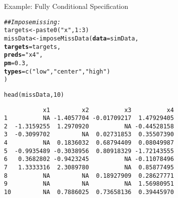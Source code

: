 \documentclass[10pt]{beamer}\usepackage[]{graphicx}\usepackage[]{color}
\makeatletter
\newcommand{\hlnum}[1]{\textcolor[rgb]{0.69,0.494,0}{#1}}%
\newcommand{\hlstr}[1]{\textcolor[rgb]{0.749,0.012,0.012}{#1}}%
\newcommand{\hlcom}[1]{\textcolor[rgb]{0.514,0.506,0.514}{\textit{#1}}}%
\newcommand{\hlopt}[1]{\textcolor[rgb]{0,0,0}{#1}}%
\newcommand{\hlstd}[1]{\textcolor[rgb]{0,0,0}{#1}}%
\newcommand{\hlkwb}[1]{\textcolor[rgb]{0,0.341,0.682}{#1}}%
\newcommand{\hlkwc}[1]{\textcolor[rgb]{0,0,0}{\textbf{#1}}}%
\newcommand{\hlkwd}[1]{\textcolor[rgb]{0.004,0.004,0.506}{#1}}%
\newenvironment{kframe}{%
 \def\at@end@of@kframe{}%
 \ifinner\ifhmode%
  \def\at@end@of@kframe{\end{minipage}}%
  \begin{minipage}{\columnwidth}%
 \fi\fi%
 \def\FrameCommand##1{\hskip\@totalleftmargin \hskip-\fboxsep
 \colorbox{shadecolor}{##1}\hskip-\fboxsep
     \hskip-\linewidth \hskip-\@totalleftmargin \hskip\columnwidth}%
 \MakeFramed {\advance\hsize-\width
   \@totalleftmargin\z@ \linewidth\hsize
   \@setminipage}}%
 {\par\unskip\endMakeFramed%
 \at@end@of@kframe}
\newenvironment{knitrout}{}{} %
\makeatother
\begin{document}

\begin{frame}{Example: Fully Conditional Specification}

\begin{knitrout}\footnotesize
{}\color{fgcolor}\begin{kframe}
\begin{alltt}
\hlcom{## Impose missing:}
\hlstd{targets}  \hlkwb{<-} \hlkwd{paste0}\hlstd{(}\hlstr{"x"}\hlstd{,} \hlnum{1}\hlopt{:}\hlnum{3}\hlstd{)}
\hlstd{missData} \hlkwb{<-} \hlkwd{imposeMissData}\hlstd{(}\hlkwc{data}    \hlstd{= simData,}
                           \hlkwc{targets} \hlstd{= targets,}
                           \hlkwc{preds}   \hlstd{=} \hlstr{"x4"}\hlstd{,}
                           \hlkwc{pm}      \hlstd{=} \hlnum{0.3}\hlstd{,}
                           \hlkwc{types} \hlstd{=} \hlkwd{c}\hlstd{(}\hlstr{"low"}\hlstd{,} \hlstr{"center"}\hlstd{,} \hlstr{"high"}\hlstd{)}
                           \hlstd{)}
\end{alltt}
\end{kframe}
\end{knitrout}

\pagebreak

\begin{knitrout}\footnotesize
{}\color{fgcolor}\begin{kframe}
\begin{alltt}
\hlkwd{head}\hlstd{(missData,} \hlnum{10}\hlstd{)}
\end{alltt}
\begin{verbatim}
           x1         x2          x3          x4
1          NA -1.4057704 -0.01709217  1.47929405
2  -1.3159255  1.2970920          NA -0.44528158
3  -0.3099702         NA  0.02731853  0.35507390
4          NA  0.1836032  0.68794409  0.08049987
5  -0.9935489 -0.3038956  0.80918329 -1.72143555
6   0.3682802 -0.9423245          NA -0.11078496
7   1.3333316  2.3089780          NA  0.85877495
8          NA         NA  0.18927909  0.28627771
9          NA         NA          NA  1.56980951
10         NA  0.7886025  0.73658136  0.39445970
\end{verbatim}
\end{kframe}
\end{knitrout}
\end{frame}
\end{document}
